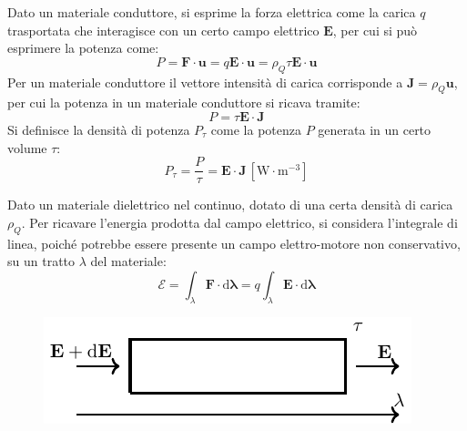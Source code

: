 \documentclass{article}
\newcommand{\vect}[1]{\boldsymbol{\mathbf{#1}}}
\newcommand{\df}{\mathrm{d}}
\newcommand{\SI}[1]{\mathrm{#1}}
\numberwithin{equation}{subsection}
\begin{document}
Dato un materiale conduttore, si esprime la forza elettrica come la carica $q$ trasportata che interagisce con un certo campo elettrico $\vect{E}$, per cui si può esprimere 
la potenza come:
\begin{equation*}
    P=\vect{F}\cdot\vect{u}=q\vect{E}\cdot\vect{u}=\rho_Q\tau\vect{E}\cdot\vect{u}
\end{equation*}
Per un materiale conduttore il vettore intensità di carica corrisponde a $\vect{J}=\rho_Q\vect{u}$, per cui la potenza in un materiale conduttore si ricava tramite:
\begin{equation*}
    P=\tau\vect{E}\cdot\vect{J}
\end{equation*}
Si definisce la densità di potenza $P_\tau$ come la potenza $P$ generata in un certo volume $\tau$: 
\begin{equation}
    P_{\tau}=\displaystyle\frac{P}{\tau}=\vect{E}\cdot\vect{J}\,\left[\SI{W}\cdot\SI{m}^{-3}\right]
\end{equation}


Dato un materiale dielettrico nel continuo, dotato di una certa densità di carica $\rho_Q$. Per ricavare l'energia prodotta dal campo elettrico, si considera l'integrale 
di linea, poiché potrebbe essere presente un campo elettro-motore non conservativo, su un tratto $\lambda$ del materiale:
\begin{equation*}
    \mathscr{E}=\displaystyle\int_{\lambda}\vect{F}\cdot \df\vect{\lambda}=q\int_{\lambda}\vect{E}\cdot \df\vect{\lambda}
\end{equation*}

\begin{figure}[H]%
    \centering
    \includegraphics{materiale-dielettrico.pdf}%
    \label{fig:materiale-dielettrico}
\end{figure}
\end{document}

